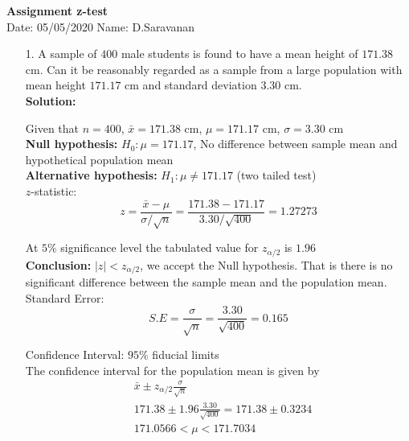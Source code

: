 \documentclass[a4paper,11pt,openright]{report}
\begin{document}
\singlespacing
\pagestyle{plain}

\begin{center}
\textbf{Assignment z-test} \\
Date: 05/05/2020 \hspace{2mm} Name: D.Saravanan
\end{center}

\vspace{10px}

\begin{enumerate}

\item[1.] A sample of $400$ male students is found to have a mean height of $171.38$ cm. Can
it be reasonably regarded as a sample from a large population with mean height $171.17$ cm 
and standard deviation $3.30$ cm. \\

\textbf{Solution:}

Given that $n = 400$, $\bar x = 171.38$ cm, $\mu = 171.17$ cm, $\sigma = 3.30$ cm \\

\textbf{Null hypothesis:} $H_{0}: \mu = 171.17$, No difference between sample mean and 
hypothetical population mean\\
\textbf{Alternative hypothesis:} $H_{1}: \mu \neq 171.17$ \hspace{5px} (two tailed test) \\

$z$-statistic:
\begin{equation*}
z = \frac{\bar x - \mu}{\sigma/\sqrt{n}}
  = \frac{171.38 - 171.17}{3.30/\sqrt{400}}
  = 1.27273
\end{equation*}

At $5\%$ significance level the tabulated value for $z_{\alpha/2}$ is $1.96$ \\

\textbf{Conclusion:} $|z| < z_{\alpha/2}$, we accept the Null hypothesis. That is there is 
no significant difference between the sample mean and the population mean. \\

Standard Error:
\begin{equation*}
S.E = \frac{\sigma}{\sqrt{n}} = \frac{3.30}{\sqrt{400}} = 0.165
\end{equation*}

Confidence Interval: $95\%$ fiducial limits \\
The confidence interval for the population mean is given by 
\begin{equation*}
\begin{split}
&\bar x \pm z_{\alpha/2} \frac{\sigma}{\sqrt{n}} \\
&171.38 \pm 1.96 \frac{3.30}{\sqrt{400}} = 171.38 \pm 0.3234 \\
&171.0566 < \mu < 171.7034
\end{split}
\end{equation*}


\end{enumerate}
\end{document}
